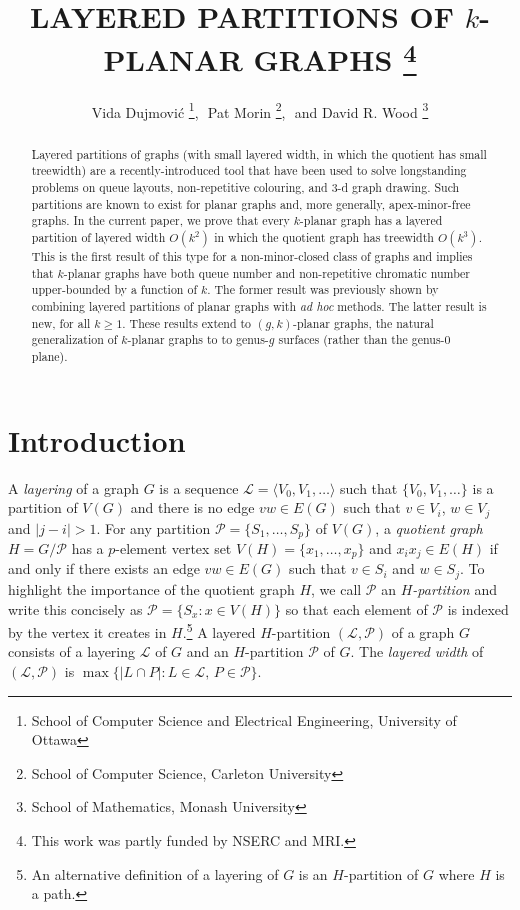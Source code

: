 \documentclass{patmorin}
\title{\MakeUppercase{Layered Partitions of $k$-Planar Graphs}%
    \thanks{This work was partly funded by NSERC and MRI.}}
\author{Vida Dujmovi\'c%
        \thanks{School of Computer Science and Electrical Engineering,
                University of Ottawa},\,\,
        Pat Morin%
        \thanks{School of Computer Science, Carleton University},\,\, and
        David R. Wood%
        \thanks{School of Mathematics, Monash University}}
\begin{document}
\begin{titlepage}
\maketitle


\begin{abstract}
  Layered partitions of graphs (with small layered width, in which the quotient has small treewidth) are a recently-introduced tool that have been used to solve longstanding problems on queue layouts, non-repetitive colouring, and 3-d graph drawing.  Such partitions are known to exist for planar graphs and, more generally, apex-minor-free graphs.  In the current paper, we prove that every $k$-planar graph has a layered partition of layered width $O(k^2)$ in  which the quotient graph has treewidth $O(k^3)$. This is the first result of this type for a non-minor-closed class of graphs and implies that $k$-planar graphs have both queue number and non-repetitive chromatic number upper-bounded by a function of $k$. The former result was previously shown by combining layered partitions of planar graphs with \textit{ad hoc} methods. The latter result is new, for all $k\ge 1$.  These results extend to $(g,k)$-planar graphs, the natural generalization of $k$-planar graphs to to genus-$g$ surfaces (rather than the genus-$0$ plane).
\end{abstract}
\end{titlepage}

\tableofcontents
\newpage
\section{Introduction}

A \emph{layering} of a graph $G$ is a sequence $\mathcal{L}=\langle V_0,V_1,\ldots\rangle$ such that $\{V_0,V_1,\ldots\}$ is a partition of $V(G)$ and there is no edge $vw\in E(G)$ such that $v\in V_i$, $w\in V_j$ and $|j-i|>1$.  For any partition $\mathcal{P}=\{S_1,\ldots,S_p\}$ of $V(G)$, a \emph{quotient graph} $H=G/\mathcal{P}$ has a $p$-element vertex set $V(H)=\{x_1,\ldots,x_p\}$ and $x_ix_j\in E(H)$ if and only if there exists an edge $vw\in E(G)$ such that $v\in S_i$ and $w\in S_j$. To highlight the importance of the quotient graph $H$, we call $\mathcal{P}$ an \emph{$H$-partition} and write this concisely as $\mathcal{P}=\{S_x : x\in V(H)\}$ so that each element of $\mathcal{P}$ is indexed by the vertex it creates in $H$.\footnote{An alternative definition of a layering of $G$ is an $H$-partition of $G$ where $H$ is a path.}  A layered $H$-partition $(\mathcal{L},\mathcal{P})$ of a graph $G$ consists of a layering $\mathcal{L}$ of $G$ and an $H$-partition $\mathcal{P}$ of $G$. The \emph{layered width} of $(\mathcal{L},\mathcal{P})$ is $\max\{|L\cap P|: L\in\mathcal{L},\, P\in\mathcal{P}\}$.
\end{document}
